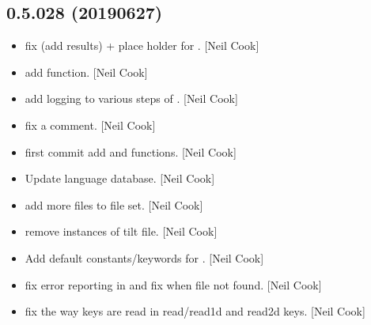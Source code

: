 \documentclass[a4paper,10pt,english]{report}
\begin{document}
\subsection{0.5.028 (2019\sphinxhyphen{}06\sphinxhyphen{}27)}
\label{\detokenize{misc/changelog:id128}}\begin{itemize}
\item {} 
 \sphinxhyphen{} fix  (add 
results) + place holder for . {[}Neil Cook{]}

\item {} 
 \sphinxhyphen{} add  function. {[}Neil
Cook{]}

\item {} 
 \sphinxhyphen{} add logging to various steps of
. {[}Neil Cook{]}

\item {} 
 \sphinxhyphen{} fix a comment. {[}Neil Cook{]}

\item {} 
 \sphinxhyphen{} first commit add  and
 functions. {[}Neil Cook{]}

\item {} 
Update language database. {[}Neil Cook{]}

\item {} 
 \sphinxhyphen{} add more files to  file set. {[}Neil Cook{]}

\item {} 
 \sphinxhyphen{} remove instances of tilt file. {[}Neil Cook{]}

\item {} 
Add default constants/keywords for . {[}Neil Cook{]}

\item {} 
 \sphinxhyphen{} fix error reporting in  and fix
 when file not found. {[}Neil Cook{]}

\item {} 
 \sphinxhyphen{} fix the way keys are read in read/read1d and read2d
keys. {[}Neil Cook{]}


\end{itemize}
\end{document}

